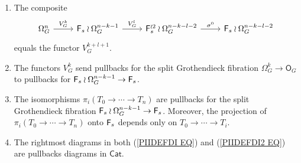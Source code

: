 \documentclass[a4paper,10pt]{article}%
\begin{document}
\begin{proposition}\label{PIIPROP PROP}
\begin{enumerate}[label=(\alph*)]
\item The composite
\[
\begin{tikzcd}
	\Omega_G^n \ar{r}{V_G^k} &
	\Fin_s \wr \Omega_G^{n-k-1} \ar{r}{V_G^l} &
	\Fin_s^{\wr 2} \wr \Omega_G^{n-k-l-2} \ar{r}{\sigma^0} &
	\Fin_s \wr \Omega_G^{n-k-l-2}
\end{tikzcd}
\]
equals the functor $V_{G}^{k+l+1}$.

\item The functors $V_G^k$ send pullbacks for the split Grothendieck fibration $\Omega_G^k \to \mathsf{O}_G$
to pullbacks for $\mathsf{F}_s \wr \Omega_G^{n-k-1} \to \mathsf{F}_s$.

\item The isomorphisms $\pi_i(T_0 \to \cdots \to T_n)$
are pullbacks for the split Grothendieck fibration 
$\mathsf{F}_s \wr \Omega_G^{n-k-1} \to \mathsf{F}_s$. Moreover, the projection of $\pi_i(T_0 \to \cdots \to T_n)$ onto $\mathsf{F}_s$
depends only on $T_0 \to \cdots \to T_i$.

\item The rightmost diagrams in both (\ref{PIIDEFDI EQ})
and (\ref{PIIDEFDI2 EQ}) are pullbacks diagrams in $\mathsf{Cat}$.


\end{enumerate}
\end{proposition}
\end{document}
